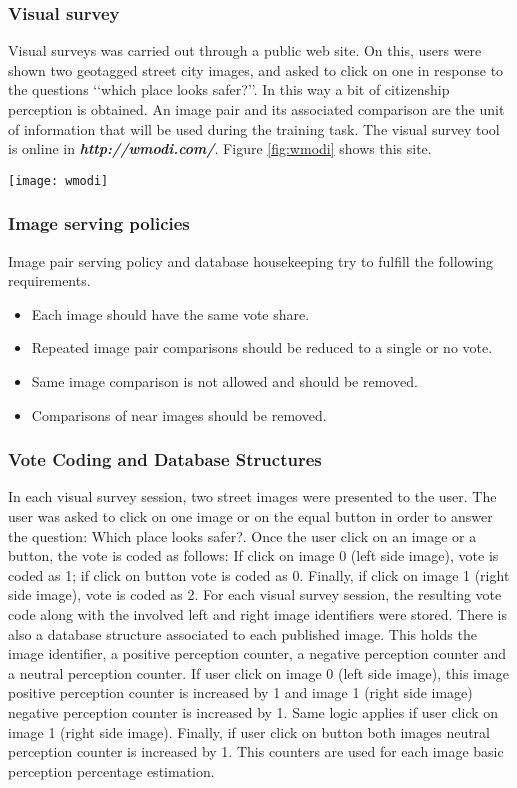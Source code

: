 \documentclass{llncs}
\begin{document}
\subsubsection{Visual survey}
Visual surveys was carried out through a public web site. On this, users were shown two geo\-tagged street city images, and asked to click on one in response to the questions ‘‘which place looks safer?’’. In this way a bit of citizenship perception is obtained. An image pair and its associated comparison are the unit of information that will be used during the training task. The visual survey tool is online in \textbf{\textit{http://wmodi.com/}}. Figure \ref{fig:wmodi} shows this site.
\begin{center}
	\centering
	\texttt{[image: wmodi]}
	\label{fig:wmodi}
\end{center}

\subsubsection{Image serving policies}
Image pair serving policy and database housekeeping try to fulfill the following requirements. 
\begin{itemize}
	\item	Each image should have the same vote share.
	\item	Repeated image pair comparisons should be reduced to a single or no vote.
	\item	Same image comparison is not allowed and should be removed.
	\item	Comparisons of near images should be removed.
\end{itemize}

\subsubsection{Vote Coding and Database Structures} 
In each visual survey session, two street images were presented to the user. The user was asked to click on one image or on the equal button in order to answer the question: Which place looks safer?. Once the user click on an image or a button, the vote is coded as follows: If click on image 0 (left side image), vote is coded as 1; if click on button  vote is coded as 0. Finally, if click on image 1 (right side image), vote is coded as 2. For each visual survey session, the resulting vote code along with the involved left and right image identifiers were stored. There is also a database structure associated to each published image. This holds the image identifier, a positive perception counter, a negative perception counter and a neutral perception counter. If user click on image 0 (left side image), this image positive perception counter is increased by 1 and image 1 (right side image) negative perception counter is increased by 1. Same logic applies if user click on image 1 (right side image). Finally, if user click on button  both images neutral perception counter is increased by 1. This counters are used for each image basic perception percentage estimation.
\end{document}
